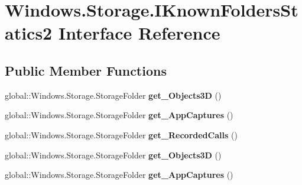 \hypertarget{interface_windows_1_1_storage_1_1_i_known_folders_statics2}{}\section{Windows.\+Storage.\+I\+Known\+Folders\+Statics2 Interface Reference}
\label{interface_windows_1_1_storage_1_1_i_known_folders_statics2}
\subsection*{Public Member Functions}
\begin{DoxyCompactItemize}
\item 
\mbox{\label{interface_windows_1_1_storage_1_1_i_known_folders_statics2_a36c2fb57cf64da4363037876c219ce76}} 
global\+::\+Windows.\+Storage.\+Storage\+Folder {\bfseries get\+\_\+\+Objects3D} ()
\item 
\mbox{\label{interface_windows_1_1_storage_1_1_i_known_folders_statics2_a8ce32e52333f150b3f0e1261c43a9804}} 
global\+::\+Windows.\+Storage.\+Storage\+Folder {\bfseries get\+\_\+\+App\+Captures} ()
\item 
\mbox{\label{interface_windows_1_1_storage_1_1_i_known_folders_statics2_aaf58ebf9d2702c67d3256c6d12225576}} 
global\+::\+Windows.\+Storage.\+Storage\+Folder {\bfseries get\+\_\+\+Recorded\+Calls} ()
\item 
\mbox{\label{interface_windows_1_1_storage_1_1_i_known_folders_statics2_a36c2fb57cf64da4363037876c219ce76}} 
global\+::\+Windows.\+Storage.\+Storage\+Folder {\bfseries get\+\_\+\+Objects3D} ()
\item 
\mbox{\label{interface_windows_1_1_storage_1_1_i_known_folders_statics2_a8ce32e52333f150b3f0e1261c43a9804}} 
global\+::\+Windows.\+Storage.\+Storage\+Folder {\bfseries get\+\_\+\+App\+Captures} ()
\item 
\mbox{\label{interface_windows_1_1_storage_1_1_i_known_folders_statics2_aaf58ebf9d2702c67d3256c6d12225576}} 

\end{DoxyCompactItemize}
